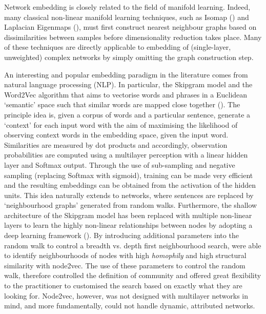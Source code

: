 \documentclass{IEEEtran}
\begin{document}
	Network embedding is closely related to the field of manifold learning. Indeed, many classical non-linear manifold learning techniques, such as Isomap (\cite{tenenbaum2000global}) and Laplacian Eigenmaps (\cite{belkin2002laplacian}), must first construct nearest neighbour graphs based on dissimilarities between samples before dimensionality reduction takes place. Many of these techniques are directly applicable to embedding of (single-layer, unweighted) complex networks by simply omitting the graph construction step.
	
	An interesting and popular embedding paradigm in the literature comes from natural language processing (NLP). In particular, the Skipgram model and the Word2Vec algorithm that aims to vectorise words and phrases in a Euclidean `semantic' space such that similar words are mapped close together (\cite{mikolov2013distributed,mikolov2013efficient}). 
	The principle idea is, given a corpus of words and a particular sentence, generate a `context' for each input word with the aim of maximising the likelihood of observing context words in the embedding space, given the input word. 
	Similarities are measured by dot products and accordingly, observation probabilities are computed using a multilayer perception with a linear hidden layer and Softmax output. Through the use of sub-sampling and negative sampling (replacing Softmax with sigmoid), training can be made very efficient and the resulting embeddings can be obtained from the activation of the hidden units. This idea naturally extends to networks, where sentences are replaced by `neighbourhood graphs' generated from random walks. Furthermore, the shallow architecture of the Skipgram model has been replaced with multiple non-linear layers to learn the highly non-linear relationships between nodes by adopting a deep learning framework (\cite{perozzi2014deepwalk,tang2015line}).
	By introducing additional parameters into the random walk to control a breadth vs. depth first neighbourhood search, \cite{grover2016node2vec} were able to identify neighbourhoods of nodes with high \textit{homophily} and high structural similarity with node2vec. The use of these parameters to control the random walk, therefore controlled the definition of community and offered great flexibility to the practitioner to customised the search based on exactly what they are looking for. 
	Node2vec, however, was not designed with multilayer networks in mind, and more fundamentally, could not handle dynamic, attributed networks. 
	
\end{document}
